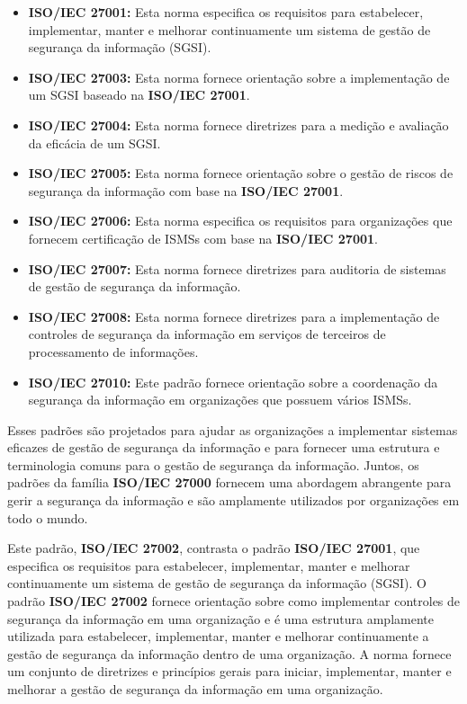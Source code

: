\begin{itemize}
  \item \textbf{ISO/IEC 27001:} Esta norma especifica os requisitos para estabelecer, implementar, manter e melhorar continuamente um sistema de gestão de segurança da informação (SGSI).
  \item \textbf{ISO/IEC 27003:} Esta norma fornece orientação sobre a implementação de um SGSI baseado na \textbf{ISO/IEC 27001}.
  \item \textbf{ISO/IEC 27004:} Esta norma fornece diretrizes para a medição e avaliação da eficácia de um SGSI.
  \item \textbf{ISO/IEC 27005:} Esta norma fornece orientação sobre o gestão de riscos de segurança da informação com base na \textbf{ISO/IEC 27001}.
  \item \textbf{ISO/IEC 27006:} Esta norma especifica os requisitos para organizações que fornecem certificação de ISMSs com base na \textbf{ISO/IEC 27001}.
  \item \textbf{ISO/IEC 27007:} Esta norma fornece diretrizes para auditoria de sistemas de gestão de segurança da informação.
  \item \textbf{ISO/IEC 27008:} Esta norma fornece diretrizes para a implementação de controles de segurança da informação em serviços de terceiros de processamento de informações.
  \item \textbf{ISO/IEC 27010:} Este padrão fornece orientação sobre a coordenação da segurança da informação em organizações que possuem vários ISMSs.
\end{itemize}

Esses padrões são projetados para ajudar as organizações a implementar sistemas eficazes de gestão de segurança da informação e para fornecer uma estrutura e terminologia comuns para o gestão de segurança da informação. Juntos, os padrões da família \textbf{ISO/IEC 27000} fornecem uma abordagem abrangente para gerir a segurança da informação e são amplamente utilizados por organizações em todo o mundo.

Este padrão, \textbf{ISO/IEC 27002}, contrasta o padrão \textbf{ISO/IEC 27001}, que especifica os requisitos para estabelecer, implementar, manter e melhorar continuamente um sistema de gestão de segurança da informação (SGSI). O padrão \textbf{ISO/IEC 27002} fornece orientação sobre como implementar controles de segurança da informação em uma organização e é uma estrutura amplamente utilizada para estabelecer, implementar, manter e melhorar continuamente a gestão de segurança da informação dentro de uma organização. A norma fornece um conjunto de diretrizes e princípios gerais para iniciar, implementar, manter e melhorar a gestão de segurança da informação em uma organização.

